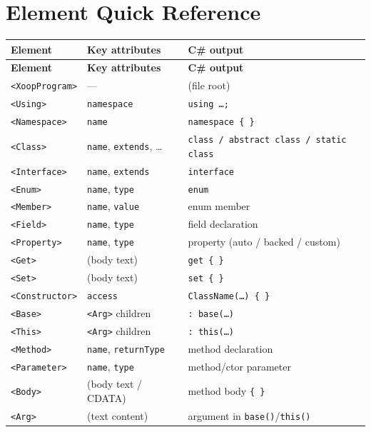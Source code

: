 \documentclass[11pt,a4paper]{article}
\newcommand{\el}[1]{\texttt{\textcolor{xoop-keyword}{<#1>}}}
\newcommand{\attr}[1]{\texttt{\textcolor{xoop-attr}{#1}}}
\newcommand{\cs}[1]{\texttt{#1}}
\begin{document}
\section{Element Quick Reference}

\begin{longtable}{lll}
\toprule
\textbf{Element} & \textbf{Key attributes} & \textbf{C\# output} \\
\midrule
\endfirsthead
\toprule
\textbf{Element} & \textbf{Key attributes} & \textbf{C\# output} \\
\midrule
\endhead
\el{XoopProgram}  & —                                   & (file root) \\
\el{Using}        & \attr{namespace}                    & \cs{using \ldots;} \\
\el{Namespace}    & \attr{name}                         & \cs{namespace \{ \}} \\
\el{Class}        & \attr{name}, \attr{extends}, \ldots & \cs{class / abstract class / static class} \\
\el{Interface}    & \attr{name}, \attr{extends}         & \cs{interface} \\
\el{Enum}         & \attr{name}, \attr{type}            & \cs{enum} \\
\el{Member}       & \attr{name}, \attr{value}           & enum member \\
\el{Field}        & \attr{name}, \attr{type}            & field declaration \\
\el{Property}     & \attr{name}, \attr{type}            & property (auto / backed / custom) \\
\el{Get}          & (body text)                         & \cs{get \{ \}} \\
\el{Set}          & (body text)                         & \cs{set \{ \}} \\
\el{Constructor}  & \attr{access}                       & \cs{ClassName(\ldots) \{ \}} \\
\el{Base}         & \el{Arg} children                  & \cs{: base(\ldots)} \\
\el{This}         & \el{Arg} children                  & \cs{: this(\ldots)} \\
\el{Method}       & \attr{name}, \attr{returnType}      & method declaration \\
\el{Parameter}    & \attr{name}, \attr{type}            & method/ctor parameter \\
\el{Body}         & (body text / CDATA)                 & method body \cs{\{ \}} \\
\el{Arg}          & (text content)                      & argument in \cs{base()}/\cs{this()} \\
\bottomrule
\end{longtable}
\end{document}
